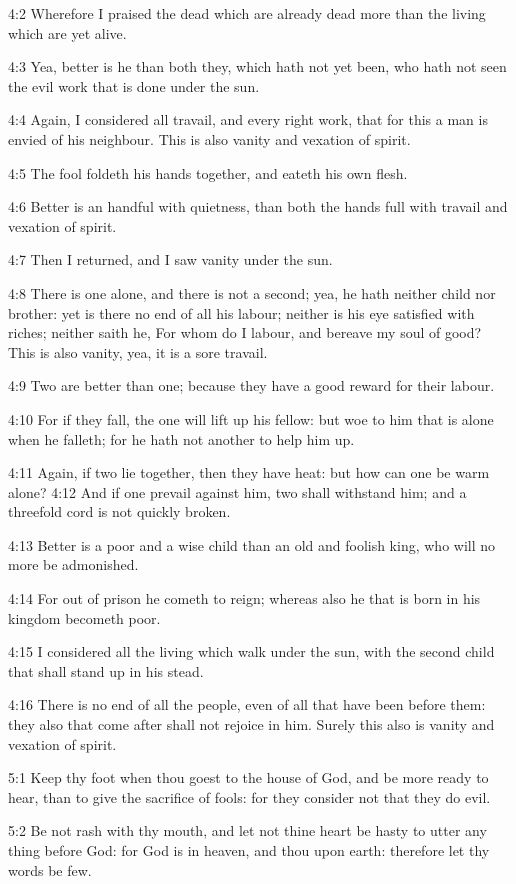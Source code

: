 4:2 Wherefore I praised the dead which are already dead more than the living which are yet alive.

4:3 Yea, better is he than both they, which hath not yet been, who hath not seen the evil work that is done under the sun.

4:4 Again, I considered all travail, and every right work, that for this a man is envied of his neighbour. This is also vanity and vexation of spirit.

4:5 The fool foldeth his hands together, and eateth his own flesh.

4:6 Better is an handful with quietness, than both the hands full with travail and vexation of spirit.

4:7 Then I returned, and I saw vanity under the sun.

4:8 There is one alone, and there is not a second; yea, he hath neither child nor brother: yet is there no end of all his labour; neither is his eye satisfied with riches; neither saith he, For whom do I labour, and bereave my soul of good? This is also vanity, yea, it is a sore travail.

4:9 Two are better than one; because they have a good reward for their labour.

4:10 For if they fall, the one will lift up his fellow: but woe to him that is alone when he falleth; for he hath not another to help him up.

4:11 Again, if two lie together, then they have heat: but how can one be warm alone?  4:12 And if one prevail against him, two shall withstand him; and a threefold cord is not quickly broken.

4:13 Better is a poor and a wise child than an old and foolish king, who will no more be admonished.

4:14 For out of prison he cometh to reign; whereas also he that is born in his kingdom becometh poor.

4:15 I considered all the living which walk under the sun, with the second child that shall stand up in his stead.

4:16 There is no end of all the people, even of all that have been before them: they also that come after shall not rejoice in him.  Surely this also is vanity and vexation of spirit.

5:1 Keep thy foot when thou goest to the house of God, and be more ready to hear, than to give the sacrifice of fools: for they consider not that they do evil.

5:2 Be not rash with thy mouth, and let not thine heart be hasty to utter any thing before God: for God is in heaven, and thou upon earth: therefore let thy words be few.

